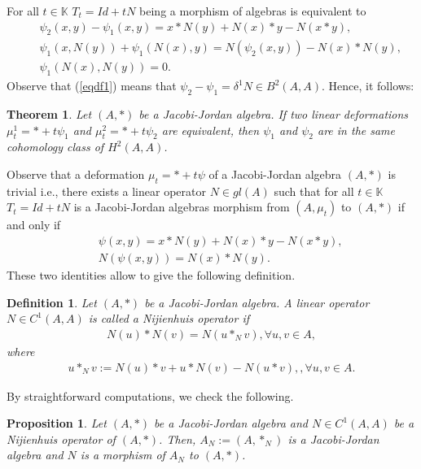 \documentclass[12pt]{amsart}
\newtheorem{theorem}[Theorem]{Theorem}
\newtheorem{definition}[Theorem]{Definition}
\newtheorem{proposition}[Theorem]{Proposition}
\begin{document}
	For all $t\in\mathbb{K}$
	$T_t=Id+tN$ being a
	morphism of algebras is equivalent to
	\begin{eqnarray}
		&&\psi_2(x,y)-\psi_1(x,y)= x\ast N(y)+N(x)\ast y-N(x\ast y), \label{eqdf1}\\
		&&\psi_1(x,N(y))+\psi_1(N(x),y)=N(\psi_2(x,y))-N(x)\ast N(y),\label{eqdf11}\\
		&&\psi_1(N(x),N(y))=0.
	\end{eqnarray}
	Observe that (\ref{eqdf1}) means that $\psi_2-\psi_1=\delta^1 N\in B^2(A,A).$ Hence, it follows:
	\begin{theorem}
		Let $(A, \ast)$ be a Jacobi-Jordan algebra. If two linear deformations 
		$\mu^1_t=\ast+t\psi_1$ and $\mu^2_t=\ast+t\psi_2$ are equivalent, then $\psi_1$ and $\psi_2$ are in the
		same cohomology class of $H^2(A, A)$.
	\end{theorem}
	Observe that a deformation $\mu_t=\ast+t\psi$ of a Jacobi-Jordan algebra $(A, \ast)$ is  trivial i.e., there
	exists a linear operator $N\in gl(A)$ such that for all $t\in\mathbb{K}$
	$T_t=Id+tN$ is  a Jacobi-Jordan algebras
	morphism from $(A, \mu_t)$ to $(A, \ast)$ if and only if
	\begin{eqnarray}
		&&\psi(x,y)= x\ast N(y)+N(x)\ast y-N(x\ast y), \label{eqdft1}\\
		&&N(\psi(x,y))=N(x)\ast N(y).
	\end{eqnarray}
	These two identities allow to give the following definition.
	\begin{definition}
		Let $(A, \ast)$ be a Jacobi-Jordan algebra.
		A linear operator $N\in C^1(A,A)$ is called a Nijienhuis operator if
		\begin{eqnarray}
			N(u)\ast N(v)=N(u\ast_N v), \forall u,v\in A, \label{njj}
		\end{eqnarray}
		where
		\begin{eqnarray}
			u\ast_N v:=N(u)\ast v+u\ast N(v)-N(u\ast v), , \forall u,v\in A.\label{opn}
		\end{eqnarray}
	\end{definition}
	By straightforward computations, we check the following.
	\begin{proposition}\label{njajo}
		Let $(A, \ast)$ be a Jacobi-Jordan algebra and $N\in C^1(A,A)$ be a Nijienhuis operator of $(A, \ast)$. Then,
		$A_N:=(A,\ast_N)$ is a Jacobi-Jordan algebra and $N$ is a morphism of $A_N$ to $(A, \ast)$.
	\end{proposition}
\end{document}
